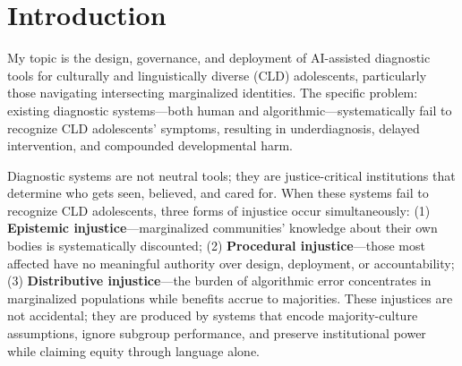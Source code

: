 \documentclass[12pt,a4paper]{article}
\begin{document}
\begin{abstract}
The central thesis is that diagnostic AI must be treated as a justice-critical institution with enforceable equity requirements, not optional enhancements. If documented diagnostic harm concentrates in CLD populations—a reality my ED415 research confirms—and those populations carry historical legacies of medical neglect and racialized dismissal, then precaution is not perfectionism—it is a basic safety stance. EQUITAS operationalizes this principle through explicit performance thresholds (equalized-odds gaps $\leq 3\%$, true-positive-rate ratios $0.9$--$1.1$), mandatory community veto authority, continuous monitoring with automatic escalation and suspension protocols, and public harm ledgers that document where benefits and harms fall.

\vspace{0.5em}


\end{abstract}

\clearpage
\footnotesize\tableofcontents
\clearpage

\section{Introduction}

My topic is the design, governance, and deployment of AI-assisted diagnostic tools for culturally and linguistically diverse (CLD) adolescents, particularly those navigating intersecting marginalized identities. The specific problem: existing diagnostic systems—both human and algorithmic—systematically fail to recognize CLD adolescents' symptoms, resulting in underdiagnosis, delayed intervention, and compounded developmental harm.

Diagnostic systems are not neutral tools; they are justice-critical institutions that determine who gets seen, believed, and cared for. When these systems fail to recognize CLD adolescents, three forms of injustice occur simultaneously: (1) \textbf{Epistemic injustice}—marginalized communities' knowledge about their own bodies is systematically discounted; (2) \textbf{Procedural injustice}—those most affected have no meaningful authority over design, deployment, or accountability; (3) \textbf{Distributive injustice}—the burden of algorithmic error concentrates in marginalized populations while benefits accrue to majorities. These injustices are not accidental; they are produced by systems that encode majority-culture assumptions, ignore subgroup performance, and preserve institutional power while claiming equity through language alone.
\end{document}
